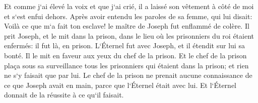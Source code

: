 \verse Et comme j`ai élevé la voix et que j`ai crié, il a laissé son vêtement à côté de moi et s`est enfui dehors. 
\verse Après avoir entendu les paroles de sa femme, qui lui disait: Voilà ce que m`a fait ton esclave! le maître de Joseph fut enflammé de colère. 
\verse Il prit Joseph, et le mit dans la prison, dans le lieu où les prisonniers du roi étaient enfermés: il fut là, en prison. 
\verse L`Éternel fut avec Joseph, et il étendit sur lui sa bonté. Il le mit en faveur aux yeux du chef de la prison. 
\verse Et le chef de la prison plaça sous sa surveillance tous les prisonniers qui étaient dans la prison; et rien ne s`y faisait que par lui. 
\verse Le chef de la prison ne prenait aucune connaissance de ce que Joseph avait en main, parce que l`Éternel était avec lui. Et l`Éternel donnait de la réussite à ce qu`il faisait. 

